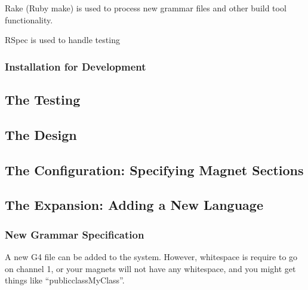 \documentclass[letter,10pt]{article}
\begin{document}
Rake (Ruby make) is used to process new grammar files and other build 
tool functionality.

RSpec is used to handle testing

\subsubsection{Installation for Development}

\subsection{The Testing}

\subsection{The Design}

\subsection{The Configuration: Specifying Magnet Sections}

\subsection{The Expansion: Adding a New Language}
\label{sec:newLang}

\subsubsection{New Grammar Specification}
A new G4 file can be added to the system. However, whitespace is
require to go on channel 1, or your magnets will not have any
whitespace, and you might get things like ``publicclassMyClass''.



\clearpage
{}
{}

\end{document}

